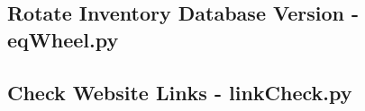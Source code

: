 \documentclass[justified]{LabArx1_5}
\begin{document}
\subsection{Rotate Inventory Database Version - eqWheel.py}



\subsection{Check Website Links - linkCheck.py}


\end{document}
